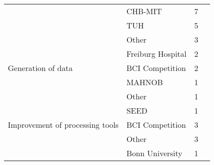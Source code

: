 \begin{tabular}{llrl}
      & CHB-MIT &            7 &                                                                                \cite{Tsiouris2018, Yuan2018a, Truong2018, Truong2018a, Page2016, Thodoroff2016, Turner2014} \\
      & TUH &            5 &                                                                                          \cite{Golmohammadi2017b, Shah2017, Golmohammadi2017a, Golmohammadi2017, Yang2016b} \\
      & Other &            3 &                                                                                                                              \cite{Truong2018, Golmohammadi2017a, Taqi2017} \\
      & Freiburg Hospital &            2 &                                                                                                                                              \cite{Truong2018, Truong2018a} \\
Generation of data & BCI Competition &            2 &                                                                                                                                               \cite{Corley2018, Zhang2018b} \\
      & MAHNOB &            1 &                                                                                                                                                             \cite{Wang2018} \\
      & Other &            1 &                                                                                                                                                       \cite{Schwabedal2018} \\
      & SEED &            1 &                                                                                                                                                             \cite{Wang2018} \\
Improvement of processing tools & BCI Competition &            3 &                                                                                                                                       \cite{Yang2018, Sturm2016, Yang2016a} \\
      & Other &            3 &                                                                                                                                     \cite{Yepes2017, Nurse2016, Stober2015} \\
      & Bonn University &            1 &                                                                                                                                                              \cite{Wen2018} \\

\end{tabular}
